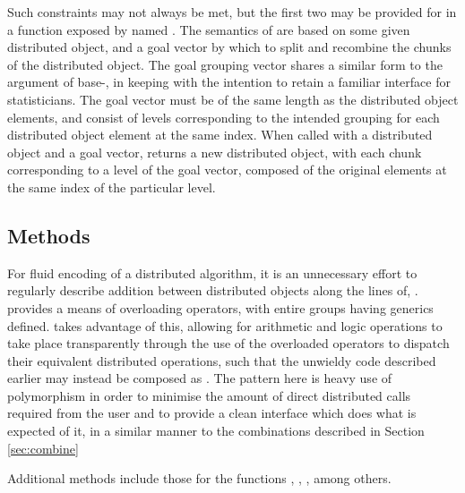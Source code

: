 Such constraints may not always be met, but the first two may be provided for in a function exposed by \lsr named .
The semantics of  are based on some given distributed object, and a goal vector by which to split and recombine the chunks of the distributed object.
The goal grouping vector shares a similar form to the  argument of base-\R {}, in keeping with the intention to retain a familiar \R interface for statisticians.
The goal vector must be of the same length as the distributed object elements, and consist of levels corresponding to the intended grouping for each distributed object element at the same index.
When called with a distributed object and a goal vector,  returns a new distributed object, with each chunk corresponding to a level of the goal vector, composed of the original elements at the same index of the particular level.

\subsection{Methods}

For fluid encoding of a distributed algorithm, it is an unnecessary effort to regularly describe addition between distributed objects along the lines of, .
\R provides a means of overloading operators, with entire groups having generics defined.
\lsr takes advantage of this, allowing for arithmetic and logic operations to take place transparently through the use of the overloaded operators to dispatch their equivalent distributed operations, such that the unwieldy code described earlier may instead be composed as .
The pattern here is heavy use of polymorphism in order to minimise the amount of direct distributed calls required from the user and to provide a clean interface which does what is expected of it, in a similar manner to the combinations described in Section \cref{sec:combine}

Additional methods include those for the functions , , , among others.

